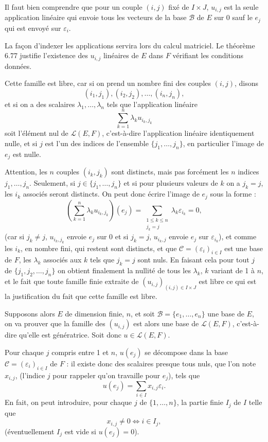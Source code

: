 Il faut bien comprendre que pour un couple $(i,j)$ fixé de $I\times J$, $u_{i,j}$ est la seule application linéaire qui envoie tous les vecteurs de la base $\mathcal B$ de $E$ sur 0 sauf le $e_j$ qui est envoyé sur $\varepsilon_i$.

La façon d'indexer les applications servira lors du calcul matriciel. Le théorème 6.77 justifie l'existence des $u_{i,j}$ linéaires de $E$ dans $F$ vérifiant les conditions données.

Cette famille est libre, car si on prend un nombre fini des couples $(i,j)$, disons
\[
(i_1,j_1),(i_2,j_2),\ldots,(i_n,j_n),
\]
et si on a des scalaires $\lambda_1,\ldots,\lambda_n$ tels que l'application linéaire
\[
\sum_{k=1}^n\lambda_k u_{i_k,j_k}
\]
soit l'élément nul de $\mathcal L(E,F)$, c'est-à-dire l'application linéaire identiquement nulle, et si $j$ est l'un des indices de l'ensemble $\{j_1,\ldots,j_n\}$, en particulier l'image de $e_j$ est nulle.

Attention, les $n$ couples $(i_k,j_k)$ sont distincts, mais pas forcément les $n$ indices $j_1,\ldots,j_n$. Seulement, si $j\in\{j_1,\ldots,j_n\}$ et si pour plusieurs valeurs de $k$ on a $j_k=j$, les $i_k$ associés seront distincts. On peut donc écrire l'image de $e_j$ sous la forme :
\[
\left(\sum_{k=1}^n\lambda_k u_{i_k,j_k}\right)(e_j)
=
\sum_{\substack{1\le k\le n\\j_k=j}}\lambda_k\varepsilon_{i_k}=0,
\]
(car si $j_k\ne j$, $u_{i_k,j_k}$ envoie $e_j$ sur 0 et si $j_k=j$, $u_{i_k,j}$ envoie $e_j$ sur $\varepsilon_{i_k}$), et comme les $i_k$, en nombre fini, qui restent sont distincts, et que $\mathcal C=(\varepsilon_i)_{i\in I}$ est une base de $F$, les $\lambda_k$ associés aux $k$ tels que $j_k=j$ sont nuls. En faisant cela pour tout $j$ de $\{j_1,j_2,\ldots,j_n\}$ on obtient finalement la nullité de tous les $\lambda_k$, $k$ variant de 1 à $n$, et le fait que toute famille finie extraite de $(u_{i,j})_{(i,j)\in I\times J}$ est libre ce qui est la justification du fait que cette famille est libre.

Supposons alors $E$ de dimension finie, $n$, et soit $\mathcal B=\{e_1,\ldots,e_n\}$ une base de $E$, on va prouver que la famille des $(u_{i,j})$ est alors une base de $\mathcal L(E,F)$, c'est-à-dire qu'elle est génératrice. Soit donc $u\in\mathcal L(E,F)$.

Pour chaque $j$ compris entre 1 et $n$, $u(e_j)$ se décompose dans la base $\mathcal C=(\varepsilon_i)_{i\in I}$ de $F$ : il existe donc des scalaires presque tous nuls, que l'on note $x_{i,j}$, (l'indice $j$ pour rappeler qu'on travaille pour $e_j$), tels que
\[
u(e_j)=\sum_{i\in I}x_{i,j}\varepsilon_i.
\]
En fait, on peut introduire, pour chaque $j$ de $\{1,\ldots,n\}$, la partie finie $I_j$ de $I$ telle que
\[
x_{i,j}\ne0\Longleftrightarrow i\in I_j,
\]
(éventuellement $I_j$ est vide si $u(e_j)=0$).

